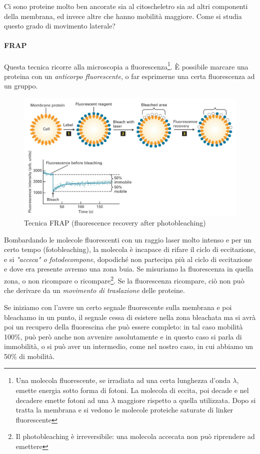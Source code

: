 \documentclass[a4paper,12pt]{article}
\begin{document}
Ci sono proteine molto ben ancorate sia al citoscheletro sia ad altri componenti della membrana, ed invece altre che hanno mobilità maggiore. Come si studia questo grado di movimento laterale?

\paragraph{FRAP}
Questa tecnica ricorre alla microscopia a fluorescenza\footnote{Una molecola fluorescente, se irradiata ad una certa lunghezza d'onda $\lambda$, emette energia sotto forma di fotoni. La molecola di eccita, poi decade e nel decadere emette fotoni ad una $\lambda$ maggiore rispetto a quella utilizzata. Dopo si tratta la membrana e si vedono le molecole proteiche saturate di linker fluorescente}. È possibile marcare una proteina con un \emph{anticorpo fluorescente}, o far esprimerne una certa fluorescenza ad un gruppo.

\begin{figure}[H]
\centering
\includegraphics[scale=0.4]{immagine/frap.jpg}
\caption{Tecnica FRAP (fluorescence recovery after photobleaching)}
\end{figure}

Bombardando le molecole fluorescenti con un raggio laser molto intenso e per un certo tempo (fotobleaching), la molecola è incapace di rifare il ciclo di eccitazione, e si \emph{"acceca" o fotodecompone}, dopodiché non partecipa più al ciclo di eccitazione e dove era presente avremo una zona buia. Se misuriamo la fluorescenza in quella zona, o non ricompare o ricompare\footnote{Il photobleaching è irreversibile: una molecola accecata non può riprendere ad emettere}. Se la fluorescenza ricompare, ciò non può che derivare da un \emph{movimento di traslazione} delle proteine.

Se iniziamo con l'avere un certo segnale fluorescente sulla membrana e poi bleachamo in un punto, il segnale cessa di esistere nella zona bleachata ma si avrà poi un recupero della fluorescina che può essere completo: in tal caso mobilità 100\%, può però anche non avvenire assolutamente e in questo caso si parla di immobilità, o si può aver un intermedio, come nel nostro caso, in cui abbiamo un 50\% di mobilità.
\end{document}
